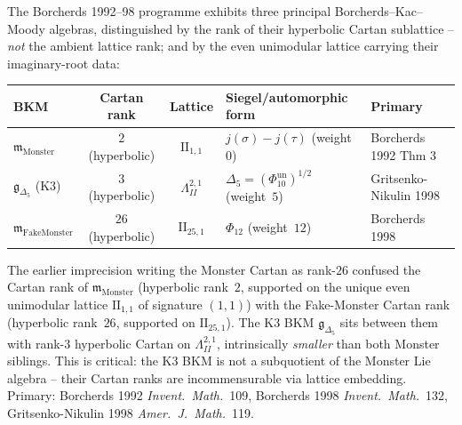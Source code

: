 \begin{remark}
\label{rem:k3ebkm-psi-rank-table}
The Borcherds 1992--98 programme exhibits three principal Borcherds--Kac--Moody
algebras, distinguished by the rank of their hyperbolic Cartan sublattice --
\emph{not} the ambient lattice rank; and by the even unimodular lattice
carrying their imaginary-root data:
\begin{center}
\renewcommand{\arraystretch}{1.3}
\begin{tabular}{@{}lccll@{}}
\toprule
BKM & Cartan rank & Lattice & Siegel/automorphic form & Primary \\
\midrule
$\mathfrak m_{\mathrm{Monster}}$ & $2$ (hyperbolic) & $\mathrm{II}_{1,1}$ & $j(\sigma) - j(\tau)$ (weight~$0$) & Borcherds 1992 Thm 3 \\
$\mathfrak g_{\Delta_5}$ (K3) & $3$ (hyperbolic) & $\Lambda^{2,1}_{II}$ & \(\Delta_5=(\Phi_{10}^{\mathrm{un}})^{1/2}\) (weight~$5$) & Gritsenko-Nikulin 1998 \\
$\mathfrak m_{\mathrm{FakeMonster}}$ & $26$ (hyperbolic) & $\mathrm{II}_{25,1}$ & $\Phi_{12}$ (weight~$12$) & Borcherds 1998 \\
\bottomrule
\end{tabular}
\end{center}
The earlier imprecision writing the Monster Cartan as rank-$26$
confused the Cartan rank of $\mathfrak m_{\mathrm{Monster}}$ (hyperbolic
rank~$2$, supported on the unique even unimodular lattice $\mathrm{II}_{1,1}$
of signature $(1,1)$) with the Fake-Monster Cartan rank
(hyperbolic rank~$26$, supported on $\mathrm{II}_{25,1}$). The K3 BKM
$\mathfrak g_{\Delta_5}$ sits between them with rank-$3$ hyperbolic Cartan
on $\Lambda^{2,1}_{II}$, intrinsically \emph{smaller} than both Monster
siblings. This is critical: the K3 BKM is not a subquotient of the
Monster Lie algebra -- their Cartan ranks are incommensurable via
lattice embedding. Primary: Borcherds 1992 \emph{Invent.\ Math.}~109,
Borcherds 1998 \emph{Invent.\ Math.}~132, Gritsenko-Nikulin 1998
\emph{Amer.\ J.\ Math.}~119.
\end{remark}


